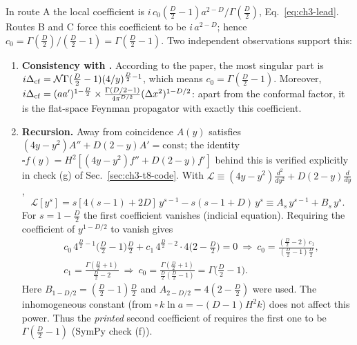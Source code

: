 In route A the local coefficient is $i\,c_0(\tfrac D2-1)a^{2-D}/\Gamma(\tfrac D2)$, Eq.~\eqref{eq:ch3-lead}. Routes B and C force this coefficient to be $i\,a^{2-D}$;
hence $c_0=\Gamma(\tfrac D2)/(\tfrac D2-1)=\Gamma(\tfrac D2-1)$. Two independent observations support this:
\begin{enumerate}[leftmargin=18pt]
\item \textbf{Consistency with .} According to the paper, the most singular part is $i\Delta_{\rm cf}=\mathcal N\Gamma(\tfrac D2-1)(4/y)^{\frac D2-1}$, which means $c_0=\Gamma(\tfrac D2-1)$.
Moreover, $i\Delta_{\rm cf}=(aa')^{1-\frac D2}\times\frac{\Gamma(D/2-1)}{4\pi^{D/2}}(\Delta x^2)^{1-D/2}$: apart from the conformal factor, it is the
flat-space Feynman propagator with exactly this coefficient.
\item \textbf{Recursion.} Away from coincidence $A(y)$ satisfies $(4y-y^2)A''+D(2-y)A'=\text{const}$; the identity $\square f(y)=H^2[(4y-y^2)f''+D(2-y)f']$ behind this is verified
explicitly in check (g) of Sec.~\ref{sec:ch3-t8-code}. With $\mathcal L\equiv(4y-y^2)\frac{d^2}{dy^2}+D(2-y)\frac{d}{dy}$,
\begin{equation}
\mathcal L[y^s]=s[4(s-1)+2D]\,y^{s-1}-s(s-1+D)\,y^s\equiv A_s\,y^{s-1}+B_s\,y^s .
\label{eq:ch3-Lys}
\end{equation}
For $s=1-\tfrac D2$ the first coefficient vanishes (indicial equation). Requiring the coefficient of $y^{1-D/2}$ to vanish gives
\begin{equation}
\begin{aligned}
&c_0\,4^{\frac D2-1}\big(\tfrac D2-1\big)\tfrac D2+c_1\,4^{\frac D2-2}\cdot4\big(2-\tfrac D2\big)=0
\ \Longrightarrow\ c_0=\frac{(\frac D2-2)\,c_1}{(\frac D2-1)\frac D2},\\
&c_1=\frac{\Gamma(\frac D2+1)}{\frac D2-2}\ \Longrightarrow\ c_0=\frac{\Gamma(\frac D2+1)}{\frac D2(\frac D2-1)}=\Gamma\big(\tfrac D2-1\big).
\end{aligned}
\label{eq:ch3-recursion}
\end{equation}
Here $B_{1-D/2}=(\tfrac D2-1)\tfrac D2$ and $A_{2-D/2}=4(2-\tfrac D2)$ were used. The inhomogeneous constant (from $\square\,k\ln a=-(D-1)H^2k$) does not affect this power.
Thus the \emph{printed} second coefficient of  requires the first one to be $\Gamma(\tfrac D2-1)$ (SymPy check (f)).
\end{enumerate}

